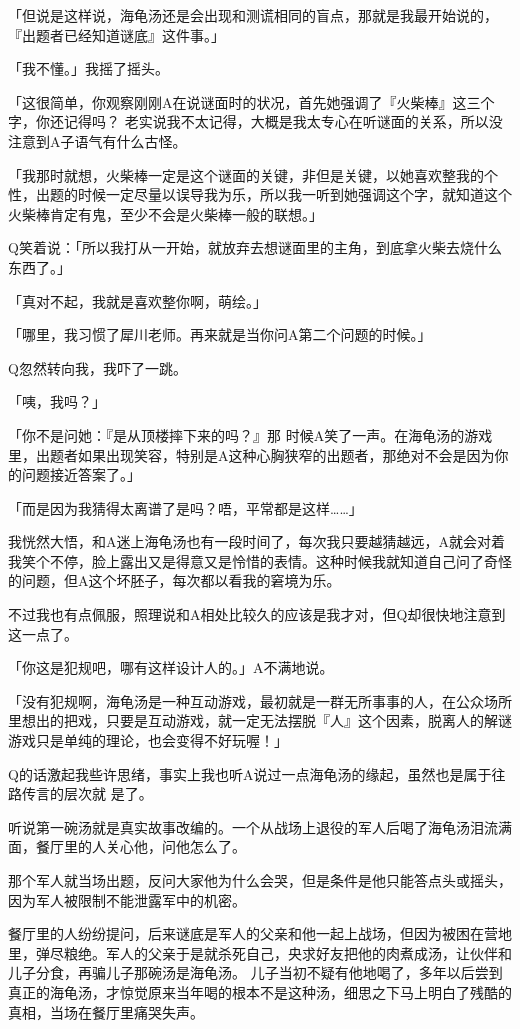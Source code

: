 \documentclass{article}
\begin{document}
「但说是这样说，海龟汤还是会出现和测谎相同的盲点，那就是我最开始说的，『出题者已经知道谜底』这件事。」 

「我不懂。」我摇了摇头。 

「这很简单，你观察刚刚A在说谜面时的状况，首先她强调了『火柴棒』这三个字，你还记得吗？
老实说我不太记得，大概是我太专心在听谜面的关系，所以没注意到A子语气有什么古怪。 

「我那时就想，火柴棒一定是这个谜面的关键，非但是关键，以她喜欢整我的个性，出题的时候一定尽量以误导我为乐，所以我一听到她强调这个字，就知道这个火柴棒肯定有鬼，至少不会是火柴棒一般的联想。」 

Q笑着说：「所以我打从一开始，就放弃去想谜面里的主角，到底拿火柴去烧什么东西了。」 

「真对不起，我就是喜欢整你啊，萌绘。」 

「哪里，我习惯了犀川老师。再来就是当你问A第二个问题的时候。」 

Q忽然转向我，我吓了一跳。 

「咦，我吗？」 

「你不是问她：『是从顶楼摔下来的吗？』那
\newpage
时候A笑了一声。在海龟汤的游戏里，出题者如果出现笑容，特别是A这种心胸狭窄的出题者，那绝对不会是因为你的问题接近答案了。」 

「而是因为我猜得太离谱了是吗？唔，平常都是这样……」 

我恍然大悟，和A迷上海龟汤也有一段时间了，每次我只要越猜越远，A就会对着我笑个不停，脸上露出又是得意又是怜惜的表情。这种时候我就知道自己问了奇怪的问题，但A这个坏胚子，每次都以看我的窘境为乐。 

不过我也有点佩服，照理说和A相处比较久的应该是我才对，但Q却很快地注意到这一点了。 

「你这是犯规吧，哪有这样设计人的。」A不满地说。 

「没有犯规啊，海龟汤是一种互动游戏，最初就是一群无所事事的人，在公众场所里想出的把戏，只要是互动游戏，就一定无法摆脱『人』这个因素，脱离人的解谜游戏只是单纯的理论，也会变得不好玩喔！」 

Q的话激起我些许思绪，事实上我也听A说过一点海龟汤的缘起，虽然也是属于往路传言的层次就
\newpage
是了。 

听说第一碗汤就是真实故事改编的。一个从战场上退役的军人后喝了海龟汤泪流满面，餐厅里的人关心他，问他怎么了。 

那个军人就当场出题，反问大家他为什么会哭，但是条件是他只能答点头或摇头，因为军人被限制不能泄露军中的机密。 

餐厅里的人纷纷提问，后来谜底是军人的父亲和他一起上战场，但因为被困在营地里，弹尽粮绝。军人的父亲于是就杀死自己，央求好友把他的肉煮成汤，让伙伴和儿子分食，再骗儿子那碗汤是海龟汤。
儿子当初不疑有他地喝了，多年以后尝到真正的海龟汤，才惊觉原来当年喝的根本不是这种汤，细思之下马上明白了残酷的真相，当场在餐厅里痛哭失声。 
\end{document}
